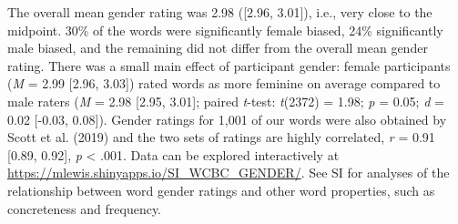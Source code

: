 \documentclass[
  english,
  ,man,floatsintext]{apa6}
\begin{document}
The overall mean gender rating was 2.98 ({[}2.96, 3.01{]}), i.e., very close to the midpoint. 30\% of the words were significantly female biased, 24\% significantly male biased, and the remaining did not differ from the overall mean gender rating. There was a small main effect of participant gender: female participants (\emph{M} = 2.99 {[}2.96, 3.03{]}) rated words as more feminine on average compared to male raters (\emph{M} = 2.98 {[}2.95, 3.01{]}; paired \emph{t}-test: \emph{t}(2372) = 1.98; \emph{p} = 0.05; \emph{d} = 0.02 {[}-0.03, 0.08{]}). Gender ratings for 1,001 of our words were also obtained by Scott et al. (2019) and the two sets of ratings are highly correlated, \emph{r} = 0.91 {[}0.89, 0.92{]}, \emph{p} \textless{} .001. Data can be explored interactively at \url{https://mlewis.shinyapps.io/SI_WCBC_GENDER/}. See SI for analyses of the relationship between word gender ratings and other word properties, such as concreteness and frequency.
\end{document}

